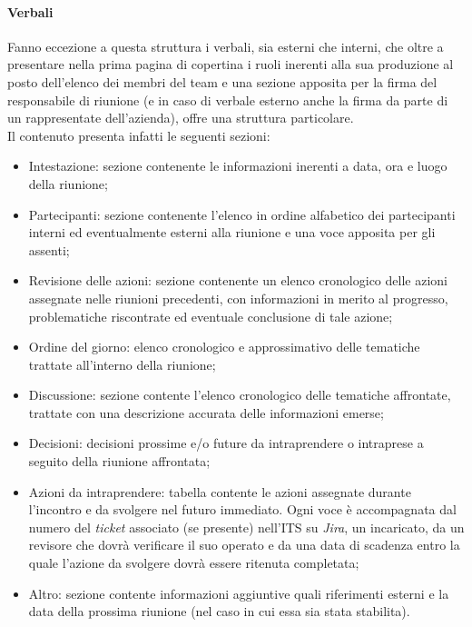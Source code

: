 \documentclass[10pt, a4paper]{article}
\begin{document}
    \paragraph{Verbali}Fanno eccezione a questa struttura i verbali, sia esterni che interni, che oltre a presentare nella prima pagina di copertina i ruoli inerenti alla sua produzione al posto dell'elenco dei membri del team e una sezione apposita per la firma del responsabile di riunione (e in caso di verbale esterno anche la firma da parte di un rappresentate dell'azienda), offre una struttura particolare.\\
    Il contenuto presenta infatti le seguenti sezioni:
    \begin{itemize}
        \item Intestazione: sezione contenente le informazioni inerenti a data, ora e luogo della riunione;
        \item Partecipanti: sezione contenente l'elenco in ordine alfabetico dei partecipanti interni ed eventualmente esterni alla riunione e una voce apposita per gli assenti;
        \item Revisione delle azioni: sezione contenente un elenco cronologico delle azioni assegnate nelle riunioni precedenti, con informazioni in merito al progresso, problematiche riscontrate ed eventuale conclusione di tale azione;
        \item Ordine del giorno: elenco cronologico e approssimativo delle tematiche trattate all'interno della riunione;
        \item Discussione: sezione contente l'elenco cronologico delle tematiche affrontate, trattate con una descrizione accurata delle informazioni emerse;
        \item Decisioni: decisioni prossime e/o future da intraprendere o intraprese a seguito della riunione affrontata;
        \item Azioni da intraprendere: tabella contente le azioni assegnate durante l'incontro e da svolgere nel futuro immediato. Ogni voce è accompagnata dal numero del \textit{ticket} associato (se presente) nell'ITS su \textit{Jira}, un incaricato, da un revisore che dovrà verificare il suo operato e da una data di scadenza entro la quale l'azione da svolgere dovrà essere ritenuta completata;
        \item Altro: sezione contente informazioni aggiuntive quali riferimenti esterni e la data della prossima riunione (nel caso in cui essa sia stata stabilita).
    \end{itemize}    
\end{document}
